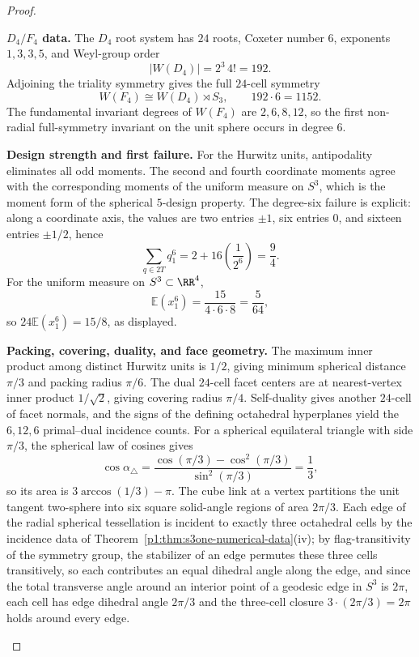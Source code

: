 \documentclass[11pt]{article}
\begin{document}
\begin{proof}
\begin{proofsteps}[label=\textbf{(\roman*)}]
\item \textbf{\(D_4/F_4\) data.}
The \(D_4\) root system has \(24\) roots, Coxeter number \(6\), exponents \(1,3,3,5\), and Weyl-group order
\[
|W(D_4)|=2^{3}\,4!=192.
\]
Adjoining the triality symmetry gives the full \(24\)-cell symmetry
\[
W(F_4)\cong W(D_4)\rtimes S_3,
\qquad
192\cdot6=1152.
\]
The fundamental invariant degrees of \(W(F_4)\) are \(2,6,8,12\), so the first non-radial full-symmetry invariant on the unit sphere occurs in degree \(6\).

\item \textbf{Design strength and first failure.}
For the Hurwitz units, antipodality eliminates all odd moments.  The second and fourth coordinate moments agree with the corresponding moments of the uniform measure on \(S^3\), which is the moment form of the spherical \(5\)-design property.  The degree-six failure is explicit: along a coordinate axis, the values are two entries \(\pm1\), six entries \(0\), and sixteen entries \(\pm1/2\), hence
\[
\sum_{q\in2T} q_1^6=2+16\left(\frac1{2^6}\right)=\frac94.
\]
For the uniform measure on \(S^3\subset\RR^4\),
\[
\mathbb E(x_1^6)=\frac{15}{4\cdot6\cdot8}=\frac5{64},
\]
so \(24\mathbb E(x_1^6)=15/8\), as displayed.

\item \textbf{Packing, covering, duality, and face geometry.}
The maximum inner product among distinct Hurwitz units is \(1/2\), giving minimum spherical distance \(\pi/3\) and packing radius \(\pi/6\).  The dual \(24\)-cell facet centers are at nearest-vertex inner product \(1/\sqrt2\), giving covering radius \(\pi/4\).  Self-duality gives another \(24\)-cell of facet normals, and the signs of the defining octahedral hyperplanes yield the \(6,12,6\) primal--dual incidence counts.  For a spherical equilateral triangle with side \(\pi/3\), the spherical law of cosines gives
\[
\cos\alpha_\triangle=
\frac{\cos(\pi/3)-\cos^2(\pi/3)}{\sin^2(\pi/3)}=\frac13,
\]
so its area is \(3\arccos(1/3)-\pi\).  The cube link at a vertex partitions the unit tangent two-sphere into six square solid-angle regions of area \(2\pi/3\).  Each edge of the radial spherical tessellation is incident to exactly three octahedral cells by the incidence data of Theorem~\ref{p1:thm:s3one-numerical-data}(iv); by flag-transitivity of the symmetry group, the stabilizer of an edge permutes these three cells transitively, so each contributes an equal dihedral angle along the edge, and since the total transverse angle around an interior point of a geodesic edge in \(S^3\) is \(2\pi\), each cell has edge dihedral angle \(2\pi/3\) and the three-cell closure \(3\cdot(2\pi/3)=2\pi\) holds around every edge.


\end{proofsteps}
\end{proof}
\end{document}
